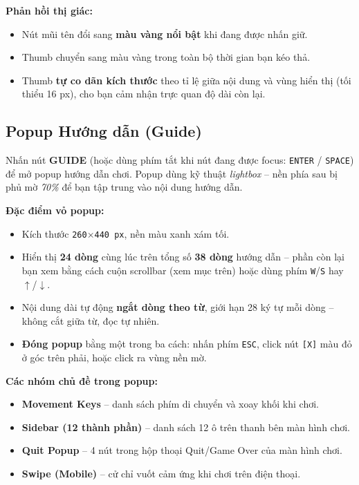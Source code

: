 \documentclass[12pt,a4paper]{article}
\begin{document}
\vspace{4pt}
\noindent\textbf{Phản hồi thị giác:}
\begin{itemize}
    \item Nút mũi tên đổi sang \textbf{màu vàng nổi bật} khi đang được nhấn giữ.
    \item Thumb chuyển sang màu vàng trong toàn bộ thời gian bạn kéo thả.
    \item Thumb \textbf{tự co dãn kích thước} theo tỉ lệ giữa nội dung và vùng hiển thị (tối thiểu 16 px), cho bạn cảm nhận trực quan độ dài còn lại.
\end{itemize}

\subsection{Popup Hướng dẫn (Guide)}
Nhấn nút \textbf{GUIDE} (hoặc dùng phím tắt khi nút đang được focus: \texttt{ENTER} / \texttt{SPACE}) để mở popup hướng dẫn chơi.
Popup dùng kỹ thuật \textit{lightbox} -- nền phía sau bị phủ mờ \emph{70\%} để bạn tập trung vào nội dung hướng dẫn.

\vspace{4pt}
\noindent\textbf{Đặc điểm vỏ popup:}
\begin{itemize}
    \item Kích thước \texttt{260$\times$440 px}, nền màu xanh xám tối.
    \item Hiển thị \textbf{24 dòng} cùng lúc trên tổng số \textbf{38 dòng} hướng dẫn -- phần còn lại bạn xem bằng cách cuộn scrollbar (xem mục trên) hoặc dùng phím \texttt{W}/\texttt{S} hay \texttt{$\uparrow$}/\texttt{$\downarrow$}.
    \item Nội dung dài tự động \textbf{ngắt dòng theo từ}, giới hạn 28 ký tự mỗi dòng -- không cắt giữa từ, đọc tự nhiên.
    \item \textbf{Đóng popup} bằng một trong ba cách: nhấn phím \texttt{ESC}, click nút \texttt{[X]} màu đỏ ở góc trên phải, hoặc click ra vùng nền mờ.
\end{itemize}

\noindent\textbf{Các nhóm chủ đề trong popup:}
\begin{itemize}
    \item \textbf{Movement Keys} -- danh sách phím di chuyển và xoay khối khi chơi.
    \item \textbf{Sidebar (12 thành phần)} -- danh sách 12 ô trên thanh bên màn hình chơi.
    \item \textbf{Quit Popup} -- 4 nút trong hộp thoại Quit/Game Over của màn hình chơi.
    \item \textbf{Swipe (Mobile)} -- cử chỉ vuốt cảm ứng khi chơi trên điện thoại.
\end{itemize}
\end{document}
